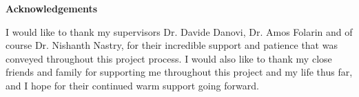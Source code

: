 \mbox{}\newline\vspace{10mm} \mbox{}\LARGE
%
{\bf Acknowledgements} \normalsize \vspace{5mm}

I would like to thank my supervisors Dr. Davide Danovi, Dr. Amos Folarin and of course Dr. Nishanth Nastry, for their incredible support and patience that was conveyed throughout this project process. I would also like to thank my close friends and family for supporting me throughout this project and my life thus far, and I hope for their continued warm support going forward.
